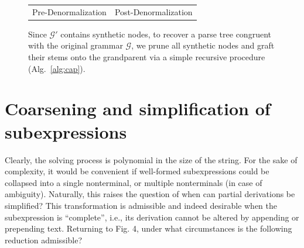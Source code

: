 \documentclass[sigplan,review,anonymous,acmsmall]{acmart}\settopmatter{printfolios=false,printccs=false,printacmref=false}
\begin{document}
\begin{figure}[H]
{\begin{tabular}{ll}
        \hspace{1cm}\Huge{Pre-Denormalization} & \hspace{2cm}\Huge{Post-Denormalization}
    \end{tabular}
  }
  \caption{Since $\mathcal{G}'$ contains synthetic nodes, to recover a parse tree congruent with the original grammar $\mathcal{G}$, we prune all synthetic nodes and graft their stems onto the grandparent via a simple recursive procedure (Alg.~\ref{alg:cap}).}%
\end{figure}

\section{Coarsening and simplification of subexpressions}

Clearly, the solving process is polynomial in the size of the string. For the sake of complexity, it would be convenient if well-formed subexpressions could be collapsed into a single nonterminal, or multiple nonterminals (in case of ambiguity). Naturally, this raises the question of when can partial derivations be simplified? This transformation is admissible and indeed desirable when the subexpression is ``complete'', i.e., its derivation cannot be altered by appending or prepending text. Returning to Fig. 4, under what circumstances is the following reduction admissible?
\end{document}
